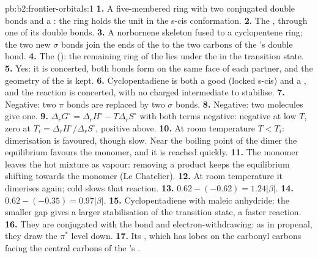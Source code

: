 \begin{solution}{pb:b2:frontier-orbitals:1}
\textbf{1.} A five-membered ring with two conjugated double bonds and a : the ring
holds the  unit in the s-cis conformation.
\textbf{2.} The , through one of its double bonds.
\textbf{3.} A norbornene skeleton fused to a cyclopentene ring; the two new $\sigma$ bonds join
the ends of the  to the two carbons of the 's double bond.
\textbf{4.} The  (): the remaining ring of the  lies under
the  in the transition state.
\textbf{5.} Yes: it is concerted, both bonds form on the same face of each partner, and the
geometry of the  is kept.
\textbf{6.} Cyclopentadiene is both a good  (locked s-cis) and a , and the
reaction is concerted, with no charged intermediate to stabilise.
\textbf{7.} Negative: two $\pi$ bonds are replaced by two $\sigma$ bonds.
\textbf{8.} Negative: two molecules give one.
\textbf{9.} $\Delta_r G^\circ = \Delta_r H^\circ - T\Delta_r S^\circ$ with both terms negative: negative at low
$T$, zero at $T_i = \Delta_r H^\circ/\Delta_r S^\circ$, positive above.
\textbf{10.} At room temperature $T < T_i$: dimerisation is favoured, though slow. Near
the boiling point of the dimer the equilibrium favours the monomer, and it is reached
quickly.
\textbf{11.} The monomer leaves the hot mixture as vapour: removing a product keeps the
equilibrium shifting towards the monomer (Le Chatelier).
\textbf{12.} At room temperature it dimerises again; cold slows that reaction.
\textbf{13.} $0.62 - (-0.62) = 1.24|\beta|$.
\textbf{14.} $0.62 - (-0.35) = 0.97|\beta|$.
\textbf{15.} Cyclopentadiene with maleic anhydride: the smaller gap gives a larger
stabilisation of the transition state, a faster reaction.
\textbf{16.} They are conjugated with the  bond and electron-withdrawing: as in
propenal, they draw the $\pi^*$ level down.
\textbf{17.} Its , which has lobes on the carbonyl carbons facing the central carbons of
the 's .

\end{solution}
